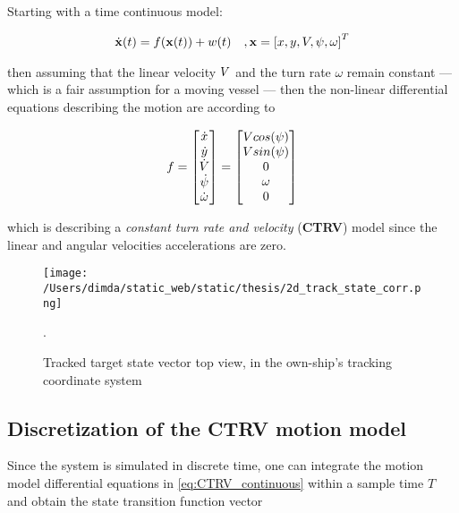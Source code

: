 Starting with a time continuous model:

\begin{equation}
\begin{aligned}\dot{\mathbf{x}}(t) = f(\mathbf{x}(t)) + w(t) &&,\mathbf{x} = \left[x,y,{V}, {\psi},\omega\right]^{T}  \end{aligned}
\end{equation}


then assuming that the linear velocity ${V}$ and the turn rate $\omega$ remain constant  --- which is a fair assumption for a moving vessel --- then the non-linear differential equations describing the motion are according to \cite{Schubert2008}

\begin{equation}\label{eq:CTRV_continuous}
f =\begin{bmatrix}\dot{x} \\ \dot{y} \\ \dot{{V}} \\ \dot{{\psi}} \\ \dot{\omega}  \end{bmatrix}=  \begin{bmatrix}{V} cos({\psi}) \\ {V} sin({\psi}) \\ 0 \\ \omega \\ 0  \end{bmatrix}
\end{equation}

which is describing a \emph{constant turn rate and velocity} (\textbf{CTRV}) model since the linear and angular velocities accelerations are zero.

\begin{figure}[H]
	\centering
	\texttt{[image: /Users/dimda/static\_web/static/thesis/2d\_track\_state\_corr.png]}
	\caption{Tracked target state vector top view, in the own-ship's tracking coordinate system}.
	\label{fig:state_vector}
\end{figure}

\subsection{Discretization of the CTRV motion model}

Since the system is simulated in discrete time, one can integrate the motion model differential equations in \cref{eq:CTRV_continuous} within a sample time $T$ and obtain the state transition function vector



